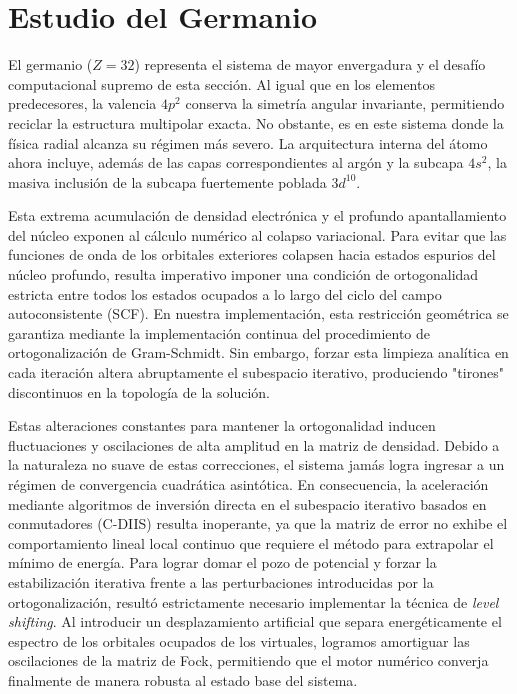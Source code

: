 \documentclass[12pt,a4paper]{book}
\begin{document}
\newpage

\section{Estudio del Germanio}
El germanio ($Z=32$) representa el sistema de mayor envergadura y el desafío computacional supremo de esta sección. Al igual que en los elementos predecesores, la valencia $4p^{2}$ conserva la simetría angular invariante, permitiendo reciclar la estructura multipolar exacta. No obstante, es en este sistema donde la física radial alcanza su régimen más severo. La arquitectura interna del átomo ahora incluye, además de las capas correspondientes al argón y la subcapa $4s^2$, la masiva inclusión de la subcapa fuertemente poblada $3d^{10}$.

Esta extrema acumulación de densidad electrónica y el profundo apantallamiento del núcleo exponen al cálculo numérico al colapso variacional. Para evitar que las funciones de onda de los orbitales exteriores colapsen hacia estados espurios del núcleo profundo, resulta imperativo imponer una condición de ortogonalidad estricta entre todos los estados ocupados a lo largo del ciclo del campo autoconsistente (SCF). En nuestra implementación, esta restricción geométrica se garantiza mediante la implementación continua del procedimiento de ortogonalización de Gram-Schmidt. Sin embargo, forzar esta limpieza analítica en cada iteración altera abruptamente el subespacio iterativo, produciendo "tirones" discontinuos en la topología de la solución.

Estas alteraciones constantes para mantener la ortogonalidad inducen fluctuaciones y oscilaciones de alta amplitud en la matriz de densidad. Debido a la naturaleza no suave de estas correcciones, el sistema jamás logra ingresar a un régimen de convergencia cuadrática asintótica. En consecuencia, la aceleración mediante algoritmos de inversión directa en el subespacio iterativo basados en conmutadores (C-DIIS) resulta inoperante, ya que la matriz de error no exhibe el comportamiento lineal local continuo que requiere el método para extrapolar el mínimo de energía. Para lograr domar el pozo de potencial y forzar la estabilización iterativa frente a las perturbaciones introducidas por la ortogonalización, resultó estrictamente necesario implementar la técnica de \textit{level shifting}. Al introducir un desplazamiento artificial que separa energéticamente el espectro de los orbitales ocupados de los virtuales, logramos amortiguar las oscilaciones de la matriz de Fock, permitiendo que el motor numérico converja finalmente de manera robusta al estado base del sistema.
\end{document}
